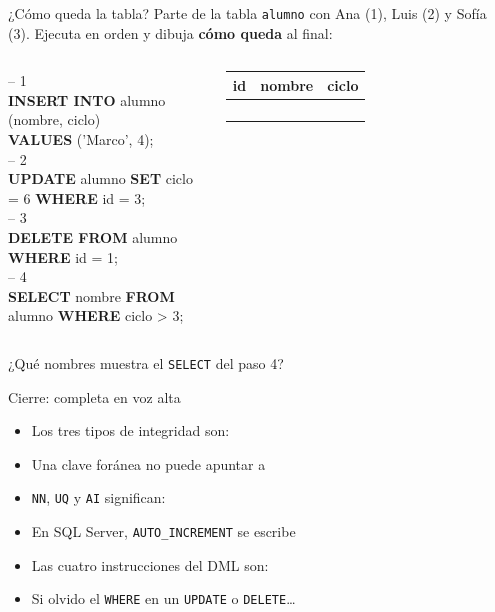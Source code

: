\documentclass[aspectratio=169,10pt,c]{beamer}
\newcommand{\bl}[1][1.9cm]{\underline{\hspace{#1}}}
\newcommand{\tbl}[1]{\textcolor{utpNaranja}{\texttt{#1}}}
\newcommand{\kw}[1]{\textcolor{utpRojo}{\textbf{#1}}}
\newcommand{\com}[1]{\textcolor{utpGris}{-- #1}}
\newcommand{\ins}[1]{\tikz[baseline=-0.5ex]{\node[rounded corners=2pt,fill=utpRojo,text=white,
  font=\bfseries\scriptsize,inner xsep=5pt,inner ysep=2.5pt] {#1};}}
\newenvironment{sqlcode}[1][.86\textwidth]
  {\begin{center}\begin{lrbox}{\sqlbuf}\begin{minipage}{#1}\ttfamily\footnotesize\vspace{6pt}\raggedright}
  {\vspace{6pt}\end{minipage}\end{lrbox}\colorbox{utpGrisClaro}{\usebox{\sqlbuf}}\end{center}}
\begin{document}
\begin{frame}{\ins{Práctica 8} ¿Cómo queda la tabla?}
\small Parte de la tabla \tbl{alumno} con Ana (1), Luis (2) y Sofía (3). Ejecuta en orden y dibuja \textbf{cómo queda} al final:
\vspace{0.25cm}
\begin{columns}[c,onlytextwidth]
\begin{sqlcode}[\textwidth]
\scriptsize
\com{1}\\
\kw{INSERT INTO} alumno (nombre, ciclo)\\
\kw{VALUES} ('Marco', 4);\\[4pt]
\com{2}\\
\kw{UPDATE} alumno \kw{SET} ciclo = 6 \kw{WHERE} id = 3;\\[4pt]
\com{3}\\
\kw{DELETE FROM} alumno \kw{WHERE} id = 1;\\[4pt]
\com{4}\\
\kw{SELECT} nombre \kw{FROM} alumno \kw{WHERE} ciclo > 3;
\end{sqlcode}
\centering\scriptsize
\begin{tabular}{p{0.5cm}p{1.2cm}p{0.9cm}}
\toprule
\bfseries id & \bfseries nombre & \bfseries ciclo \\
\midrule
\bl[0.4cm] & \bl[1.1cm] & \bl[0.7cm] \\[6pt]
\bl[0.4cm] & \bl[1.1cm] & \bl[0.7cm] \\[6pt]
\bl[0.4cm] & \bl[1.1cm] & \bl[0.7cm] \\[6pt]
\bl[0.4cm] & \bl[1.1cm] & \bl[0.7cm] \\
\bottomrule
\end{tabular}
\end{columns}
\vspace{0.35cm}
\small ¿Qué nombres muestra el \texttt{SELECT} del paso 4? \ \bl[4cm]
\end{frame}

\begin{frame}{Cierre: completa en voz alta}
\begin{itemize}\setlength\itemsep{14pt}
  \item Los tres tipos de integridad son: \bl[5cm]
  \item Una clave foránea no puede apuntar a \bl[5cm]
  \item \texttt{NN}, \texttt{UQ} y \texttt{AI} significan: \bl[5cm]
  \item En SQL Server, \texttt{AUTO\_INCREMENT} se escribe \bl[3cm]
  \item Las cuatro instrucciones del DML son: \bl[5cm]
  \item Si olvido el \texttt{WHERE} en un \texttt{UPDATE} o \texttt{DELETE}\ldots \bl[4cm]
\end{itemize}
\end{frame}
\end{document}
